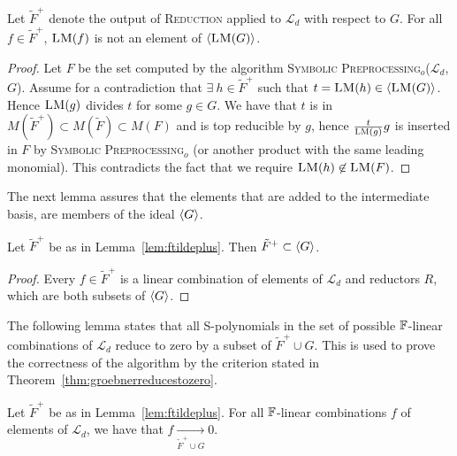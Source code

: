 \begin{lemma} \cite[p.59]{Segers2004}
\label{lem:ftildeplus}
Let $\tilde{F}^+$ denote the output of \textsc{Reduction} applied to $\mathcal{L}_d$ with respect to $G$. For all $f \in \tilde{F}^+$, $\textsc{LM}(f)$ is not an element of $\ideal{\LM(G)}$.
\end{lemma}

\begin{proof} \cite[p.59]{Segers2004}
Let $F$ be the set computed by the algorithm \textsc{Symbolic Preprocessing$_o$}($\mathcal{L}_d$, $G$). Assume for a contradiction that $\exists\ h \in \tilde{F}^+$ such that $t = \LM(h) \in \ideal{\LM(G)}$. Hence $\textsc{LM}(g)$ divides $t$ for some $g \in G$. We have that $t$ is in $M(\tilde{F}^+) \subset  M(\tilde{F})
\subset M(F)$ and is top reducible by $g$, hence $\frac{t}{\textsc{LM}(g)}g$ is inserted in $F$ by \textsc{Symbolic Preprocessing$_o$} (or another product with the same leading monomial). This contradicts the fact that we require $\textsc{LM}(h) \not\in \textsc{LM}(F)$.
\end{proof}

The next lemma assures that the elements that are added to the intermediate
basis, are members of the ideal $\langle {G} \rangle$.

\begin{lemma} \cite[p.59]{Segers2004}
\label{lem:ftildesubsetidg}
Let $\tilde{F}^+$ be as in Lemma~\ref{lem:ftildeplus}. Then $\tilde{F}^+ \subset \langle {G} \rangle$.
\end{lemma}
\begin{proof} \cite[p.60]{Segers2004}
Every $f \in \tilde{F}^+$ is a linear combination of elements of $\mathcal{L}_d$
and reductors $R$, which are both subsets of $\langle {G} \rangle$.
\end{proof}

The following lemma states that all S-polynomials in the set of possible
$\mathbb{F}$-linear combinations of $\mathcal{L}_d$ reduce to zero
by a subset of $\tilde{F}^+ \cup G$. This is used to prove the correctness of the algorithm by the criterion stated in
Theorem~\ref{thm:groebnerreducestozero}.

\begin{lemma} \cite[p.60]{Segers2004}
\label{lem:reducetozero}
Let $\tilde{F}^+$ be as in Lemma~\ref{lem:ftildeplus}. For all $\mathbb{F}$-linear combinations $f$ of elements of $\mathcal{L}_d$, we have that $f \underset{ \tilde{F}^+ \cup G}{\longrightarrow} 0$.
\end{lemma}

